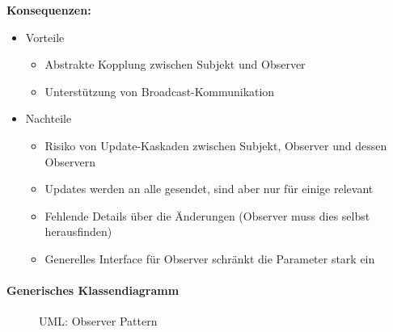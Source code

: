 				\textbf{Konsequenzen:}
				\begin{itemize}
					\item Vorteile
						\begin{itemize}
							\item Abstrakte Kopplung zwischen Subjekt und Observer
							\item Unterstützung von Broadcast-Kommunikation
						\end{itemize}
					\item Nachteile
						\begin{itemize}
							\item Risiko von Update-Kaskaden zwischen Subjekt, Observer und dessen Observern
							\item Updates werden an alle gesendet, sind aber nur für einige relevant
							\item Fehlende Details über die Änderungen (Observer muss dies selbst herausfinden)
							\item Generelles Interface für Observer schränkt die Parameter stark ein
						\end{itemize}
				\end{itemize}
			
			\paragraph{Generisches Klassendiagramm}
				\begin{figure}[ht]
					\centering
					\caption{UML: Observer Pattern}
				\end{figure}
			
